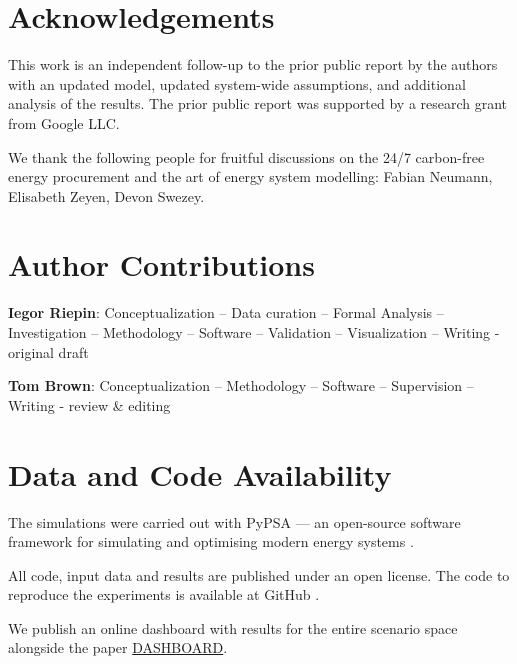 \documentclass[11pt, 5p, nopreprintline]{elsarticle}
\begin{document}
\section*{Acknowledgements}

This work is an independent follow-up to the prior public report by the authors \cite{riepin-zenodo-systemlevel247} with an updated model, updated system-wide assumptions, and additional analysis of the results. The prior public report was supported by a research grant from Google LLC. 

We thank the following people for fruitful discussions on the 24/7 carbon-free energy procurement and the art of energy system modelling: Fabian Neumann, Elisabeth Zeyen, Devon Swezey.

\section*{Author Contributions}


\textbf{Iegor Riepin}:
Conceptualization --
Data curation --
Formal Analysis --
Investigation --
Methodology --
Software --
Validation --
Visualization --
Writing - original draft

\textbf{Tom Brown}:
Conceptualization --
Methodology --
Software --
Supervision --
Writing - review \& editing

\section*{Data and Code Availability}
\label{sec:code}

The simulations were carried out with PyPSA --- an open-source software framework for simulating and optimising modern energy systems \cite{brownPyPSAPythonPower2018}. 

All code, input data and results are published under an open license. The code to reproduce the experiments is available at GitHub \cite{github-247CFEpaper}.

We publish an online dashboard with results for the entire scenario space alongside the paper \href{}{DASHBOARD}. 


\printglossary[type=\acronymtype]

\renewcommand{\ttdefault}{\sfdefault}


\end{document}
